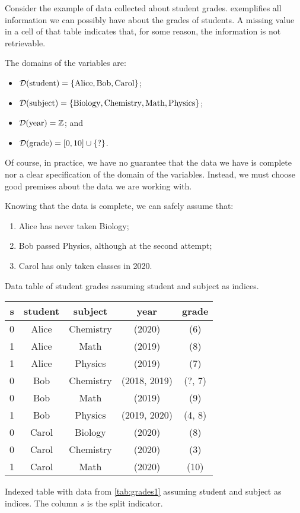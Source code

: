 Consider the example of data collected about student grades.  
exemplifies all information we can possibly have about the grades of students.  A missing
value in a cell of that table indicates that, for some reason, the information is not
retrievable.

The domains of the variables are:
\begin{itemize}
  \itemsep0em
  \item $\mathcal{D}\!\left(\text{student}\right) = \left\{\text{Alice}, \text{Bob}, \text{Carol}\right\}$;
  \item $\mathcal{D}\!\left(\text{subject}\right) = \left\{\text{Biology}, \text{Chemistry}, \text{Math},
    \text{Physics}\right\}$;
  \item $\mathcal{D}\!\left(\text{year}\right) = \mathbb{Z}$; and
  \item $\mathcal{D}\!\left(\text{grade}\right) = \left[0, 10\right] \cup \left\{\text{?}\right\}$.
\end{itemize}

Of course, in practice, we have no guarantee that the data we have is complete nor a
clear specification of the domain of the variables.  Instead, we must choose good
premises about the data we are working with.

Knowing that the data is complete, we can safely assume that:
\begin{enumerate}
  \itemsep0em
  \item Alice has never taken Biology;
  \item Bob passed Physics, although at the second attempt;
  \item Carol has only taken classes in 2020.
\end{enumerate}

\begin{tablebox}[label=tab:grades2]{Data table of student grades assuming student and subject as indices.}
  \centering
  \begin{tabular}{ccccc}
    \toprule
    \textbf{s} & \textbf{student} & \textbf{subject} & \textbf{year} & \textbf{grade} \\
    \midrule
    0 & Alice & Chemistry & (2020) & (6) \\
    1 & Alice & Math & (2019) & (8) \\
    1 & Alice & Physics & (2019) & (7) \\
    0 & Bob & Chemistry & (2018, 2019) & (?, 7) \\
    0 & Bob & Math & (2019) & (9) \\
    1 & Bob & Physics & (2019, 2020) & (4, 8) \\
    0 & Carol & Biology & (2020) & (8) \\
    0 & Carol & Chemistry & (2020) & (3) \\
    1 & Carol & Math & (2020) & (10) \\
    \bottomrule
  \end{tabular}
  \tcblower
  Indexed table with data from \cref{tab:grades1} assuming student and
  subject as indices.  The column $s$ is the split indicator.
\end{tablebox}


